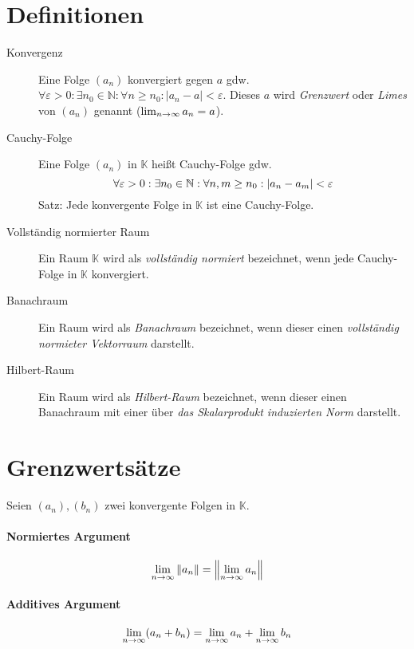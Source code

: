     \section{Definitionen}
        \begin{description}
            \item[Konvergenz] Eine Folge $ (a _ n) $ konvergiert gegen $ a $ gdw. $ \forall \varepsilon > 0 : \exists n _ 0 \in \mathbb{N} : \forall n \geq n _ 0 : \lvert a _ n - a \rvert < \varepsilon $. Dieses $ a $ wird \textit{Grenzwert} oder \textit{Limes} von $ (a _ n) $ genannt ($ \lim_{n \to \infty} a _ n = a $).
            \item[Cauchy-Folge] Eine Folge $ (a _ n) $ in $ \mathbb{K} $ heißt Cauchy-Folge gdw. \[ \forall \varepsilon > 0 : \exists n _ 0 \in \mathbb{N} : \forall n, m \geq n _ 0 : \abs{a _ n - a _ m} < \varepsilon \] Satz: Jede konvergente Folge in $ \mathbb{K} $ ist eine Cauchy-Folge.
            \item[Vollständig normierter Raum] Ein Raum $ \mathbb{K} $ wird als \textit{vollständig normiert} bezeichnet, wenn jede Cauchy-Folge in $ \mathbb{K} $ konvergiert.
            \item[Banachraum] Ein Raum wird als \textit{Banachraum} bezeichnet, wenn dieser einen \textit{vollständig normieter Vektorraum} darstellt.
            \item[Hilbert-Raum] Ein Raum wird als \textit{Hilbert-Raum} bezeichnet, wenn dieser einen Banachraum mit einer über \textit{das Skalarprodukt induzierten Norm} darstellt.
        \end{description}

    \section{Grenzwertsätze}
        Seien $ (a _ n), (b _ n) $ zwei konvergente Folgen in $ \mathbb{K} $.

        \paragraph{Normiertes Argument}
            \[ \lim_{n \to \infty} \norm{a _ n} = \norm{\lim_{n \to \infty} a _ n} \]

        \paragraph{Additives Argument}
            \[ \lim_{n \to \infty} (a _ n + b _ n) = \lim_{n \to \infty} a _ n + \lim_{n \to \infty} b _ n \]

